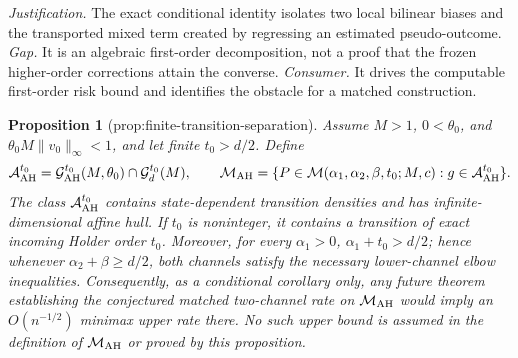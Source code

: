 \documentclass{article}
\newtheorem{proposition}{Proposition}
\begin{document}
\par\smallskip\noindent \textit{Justification.} The exact conditional identity isolates two local bilinear biases and the transported mixed term created by regressing an estimated pseudo-outcome. \textit{Gap.} It is an algebraic first-order decomposition, not a proof that the frozen higher-order corrections attain the converse. \textit{Consumer.} It drives the computable first-order risk bound and identifies the obstacle for a matched construction.

\begin{proposition}[prop:finite-transition-separation]\label{prop:finite-transition-separation}
Assume \(M>1\), \(0<\theta_0\), and \(\theta_0M\|v_0\|_\infty<1\), and let finite \(t_0>d/2\). Define
\[
\mathcal A_{\rm AH}^{t_0}=\mathcal G_{\rm AH}^{t_0}(M,\theta_0)\cap\mathcal G_d^{t_0}(M),
\qquad
\mathcal M_{\rm AH}=\{P\in\mathcal M(\alpha_1,\alpha_2,\beta,t_0;M,c):g\in\mathcal A_{\rm AH}^{t_0}\}.
\]
The class \(\mathcal A_{\rm AH}^{t_0}\) contains state-dependent transition densities and has infinite-dimensional affine hull. If \(t_0\) is noninteger, it contains a transition of exact incoming Holder order \(t_0\). Moreover, for every \(\alpha_1>0\), \(\alpha_1+t_0>d/2\); hence whenever \(\alpha_2+\beta\ge d/2\), both channels satisfy the necessary lower-channel elbow inequalities. Consequently, as a conditional corollary only, any future theorem establishing the conjectured matched two-channel rate on \(\mathcal M_{\rm AH}\) would imply an \(O(n^{-1/2})\) minimax upper rate there. No such upper bound is assumed in the definition of \(\mathcal M_{\rm AH}\) or proved by this proposition.
\end{proposition}
\end{document}
